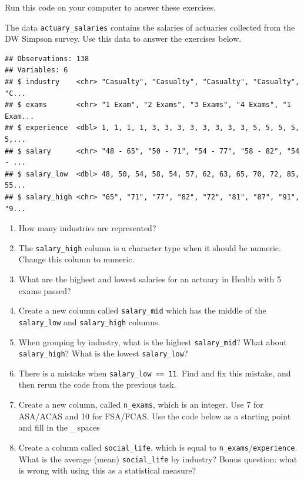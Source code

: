 \documentclass[openany]{book}
\newenvironment{Shaded}{\begin{snugshade}}{\end{snugshade}}
\newcommand{\KeywordTok}[1]{\textcolor[rgb]{0.13,0.29,0.53}{\textbf{#1}}}
\newcommand{\NormalTok}[1]{#1}
\newcommand{\OperatorTok}[1]{\textcolor[rgb]{0.81,0.36,0.00}{\textbf{#1}}}
\newcommand{\StringTok}[1]{\textcolor[rgb]{0.31,0.60,0.02}{#1}}
\providecommand{\tightlist}{%
  \setlength{\itemsep}{0pt}\setlength{\parskip}{0pt}}
\begin{document}
Run this code on your computer to answer these exercises.

The data \texttt{actuary\_salaries} contains the salaries of actuaries collected from the DW Simpson survey. Use this data to answer the exercises below.

\begin{Shaded}
\end{Shaded}

\begin{verbatim}
## Observations: 138
## Variables: 6
## $ industry    <chr> "Casualty", "Casualty", "Casualty", "Casualty", "C...
## $ exams       <chr> "1 Exam", "2 Exams", "3 Exams", "4 Exams", "1 Exam...
## $ experience  <dbl> 1, 1, 1, 1, 3, 3, 3, 3, 3, 3, 3, 3, 5, 5, 5, 5, 5,...
## $ salary      <chr> "48 - 65", "50 - 71", "54 - 77", "58 - 82", "54 - ...
## $ salary_low  <dbl> 48, 50, 54, 58, 54, 57, 62, 63, 65, 70, 72, 85, 55...
## $ salary_high <chr> "65", "71", "77", "82", "72", "81", "87", "91", "9...
\end{verbatim}

\begin{enumerate}
\def\labelenumi{\arabic{enumi}.}
\tightlist
\item
  How many industries are represented?
\item
  The \texttt{salary\_high} column is a character type when it should be numeric. Change this column to numeric.
\item
  What are the highest and lowest salaries for an actuary in Health with 5 exams passed?
\item
  Create a new column called \texttt{salary\_mid} which has the middle of the \texttt{salary\_low} and \texttt{salary\_high} columns.
\item
  When grouping by industry, what is the highest \texttt{salary\_mid}? What about \texttt{salary\_high}? What is the lowest \texttt{salary\_low}?
\item
  There is a mistake when \texttt{salary\_low\ ==\ 11}. Find and fix this mistake, and then rerun the code from the previous task.
\item
  Create a new column, called \texttt{n\_exams}, which is an integer. Use 7 for ASA/ACAS and 10 for FSA/FCAS. Use the code below as a starting point and fill in the \texttt{\_} spaces
\item
  Create a column called \texttt{social\_life}, which is equal to \texttt{n\_exams}/\texttt{experience}. What is the average (mean) \texttt{social\_life} by industry? Bonus question: what is wrong with using this as a statistical measure?
\end{enumerate}
\end{document}
